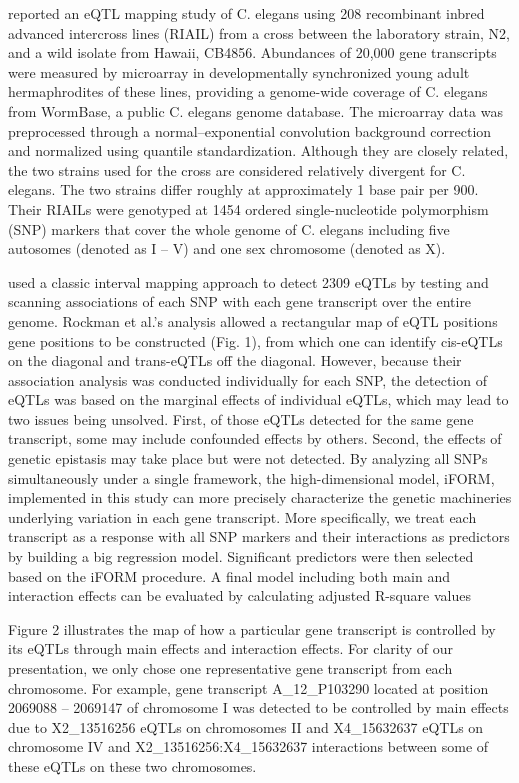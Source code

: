 \documentclass[]{book}
\theoremstyle{definition}
\theoremstyle{definition}
\theoremstyle{remark}
\begin{document}
\cite{rockman2010selection} reported an eQTL mapping study of C. elegans
using 208 recombinant inbred advanced intercross lines (RIAIL) from a
cross between the laboratory strain, N2, and a wild isolate from Hawaii,
CB4856. Abundances of 20,000 gene transcripts were measured by
microarray in developmentally synchronized young adult hermaphrodites of
these lines, providing a genome-wide coverage of C. elegans from
WormBase, a public C. elegans genome database. The microarray data was
preprocessed through a normal--exponential convolution background
correction and normalized using quantile standardization. Although they
are closely related, the two strains used for the cross are considered
relatively divergent for C. elegans. The two strains differ roughly at
approximately 1 base pair per 900. Their RIAILs were genotyped at 1454
ordered single-nucleotide polymorphism (SNP) markers that cover the
whole genome of C. elegans including five autosomes (denoted as I -- V)
and one sex chromosome (denoted as X).

\cite{rockman2010selection} used a classic interval mapping approach to
detect 2309 eQTLs by testing and scanning associations of each SNP with
each gene transcript over the entire genome. Rockman et al.'s analysis
allowed a rectangular map of eQTL positions  gene positions to be
constructed (Fig. 1), from which one can identify cis-eQTLs on the
diagonal and trans-eQTLs off the diagonal. However, because their
association analysis was conducted individually for each SNP, the
detection of eQTLs was based on the marginal effects of individual
eQTLs, which may lead to two issues being unsolved. First, of those
eQTLs detected for the same gene transcript, some may include confounded
effects by others. Second, the effects of genetic epistasis may take
place but were not detected. By analyzing all SNPs simultaneously under
a single framework, the high-dimensional model, iFORM, implemented in
this study can more precisely characterize the genetic machineries
underlying variation in each gene transcript. More specifically, we
treat each transcript as a response with all SNP markers and their
interactions as predictors by building a big regression model.
Significant predictors were then selected based on the iFORM procedure.
A final model including both main and interaction effects can be
evaluated by calculating adjusted R-square values

Figure 2 illustrates the map of how a particular gene transcript is
controlled by its eQTLs through main effects and interaction effects.
For clarity of our presentation, we only chose one representative gene
transcript from each chromosome. For example, gene transcript
A\_12\_P103290 located at position 2069088 -- 2069147 of chromosome I
was detected to be controlled by main effects due to X2\_13516256 eQTLs
on chromosomes II and X4\_15632637 eQTLs on chromosome IV and
X2\_13516256:X4\_15632637 interactions between some of these eQTLs on
these two chromosomes.
\end{document}
